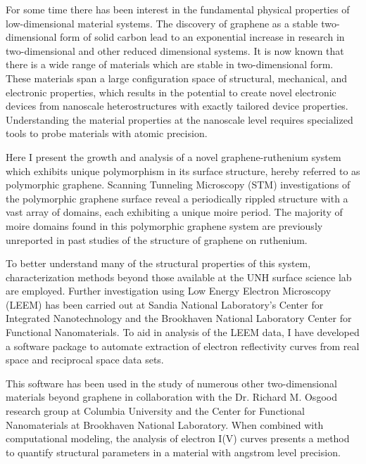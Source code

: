 \begin{abstractpage}
\indent

For some time there has been interest in the fundamental physical properties of low-dimensional
material systems. The discovery of graphene as a stable two-dimensional form of solid carbon lead
to an exponential increase in research in two-dimensional and other reduced dimensional systems.
It is now known that there is a wide range of materials which are stable in two-dimensional form.
These materials span a large configuration space of structural, mechanical, and electronic properties,
which results in the potential to create novel electronic devices from nanoscale heterostructures with
exactly tailored device properties. Understanding the material properties at the nanoscale level requires
specialized tools to probe materials with atomic precision.

Here I present the growth and analysis of a novel graphene-ruthenium system which exhibits unique polymorphism in its
surface structure, hereby referred to as polymorphic graphene. Scanning Tunneling Microscopy (STM) investigations
of the polymorphic graphene surface reveal a periodically rippled structure with a vast array of domains, each
exhibiting a unique moire period. The majority of moire domains found in this polymorphic graphene system are previously unreported in past studies of the structure of graphene on ruthenium.

To better understand many of the structural properties of this system, characterization methods beyond
those available at the UNH surface science lab are employed. Further investigation using Low Energy
Electron Microscopy (LEEM) has been carried out at Sandia National Laboratory's Center for Integrated Nanotechnology and the Brookhaven National Laboratory Center for Functional Nanomaterials. To aid in analysis of the LEEM data, I have developed a software package to automate extraction of electron reflectivity curves from real space and reciprocal space data sets.

This software has been used in the study of numerous other two-dimensional materials beyond graphene in collaboration with the Dr. Richard M. Osgood research group at Columbia University and the Center for Functional Nanomaterials at Brookhaven National Laboratory. When combined with computational modeling, the analysis of electron I(V) curves presents a method to quantify structural parameters in a material with angstrom level precision.


\end{abstractpage}
